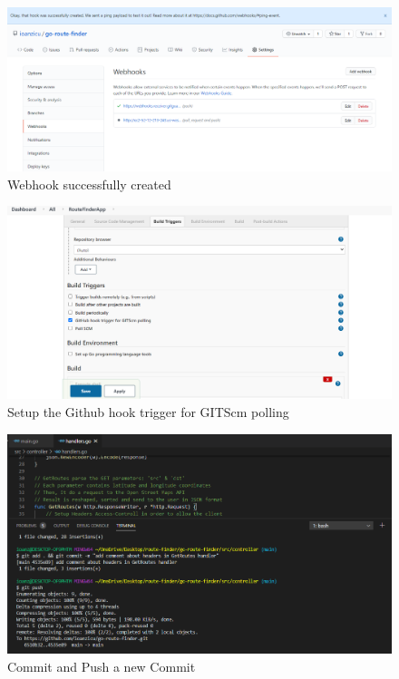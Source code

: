 \documentclass[12pt,a4paper,twoside]{article}
\begin{document}
\begin{figure}[h!]
    \centering
        \includegraphics[width=15cm]{images-aws/51---web-hook-created.png}
        \caption{Webhook successfully created}
\end{figure}



\begin{figure}[h!]
    \centering
        \includegraphics[width=15cm]{images-aws/52---trigger-jenkins.png}
        \caption{Setup the Github hook trigger for GITScm polling}
\end{figure}




\begin{figure}[h!]
    \centering
        \includegraphics[width=15cm]{images-aws/53--small-commit-after-fixed-branches.png}
        \caption{Commit and Push a new Commit}
\end{figure}
\end{document}
